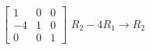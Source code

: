 {$\begin{bmatrix}
		1 & 0 & 0 \\ 
		-4 & 1 & 0 \\ 
		0 & 0 & 1
		\end{bmatrix}$ }
{$R_2-4R_1\to R_2$}